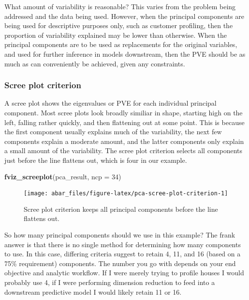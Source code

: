 \documentclass[]{book}
\newenvironment{Shaded}{\begin{snugshade}}{\end{snugshade}}
\newcommand{\DataTypeTok}[1]{\textcolor[rgb]{0.13,0.29,0.53}{#1}}
\newcommand{\DecValTok}[1]{\textcolor[rgb]{0.00,0.00,0.81}{#1}}
\newcommand{\KeywordTok}[1]{\textcolor[rgb]{0.13,0.29,0.53}{\textbf{#1}}}
\newcommand{\NormalTok}[1]{#1}
\theoremstyle{definition}
\theoremstyle{definition}
\theoremstyle{definition}
\theoremstyle{remark}
\begin{document}
What amount of variability is reasonable? This varies from the problem
being addressed and the data being used. However, when the principal
components are being used for descriptive purposes only, such as
customer profiling, then the proportion of variability explained may be
lower than otherwise. When the principal components are to be used as
replacements for the original variables, and used for further inference
in models downstream, then the PVE should be as much as can conveniently
be achieved, given any constraints.

\hypertarget{scree-plot-criterion}{%
\subsubsection{Scree plot criterion}\label{scree-plot-criterion}}

A scree plot shows the eigenvalues or PVE for each individual principal
component. Most scree plots look broadly similiar in shape, starting
high on the left, falling rather quickly, and then flattening out at
some point. This is because the first component usually explains much of
the variability, the next few components explain a moderate amount, and
the latter components only explain a small amount of the variability.
The scree plot criterion selects all components just before the line
flattens out, which is four in our example.

\begin{Shaded}
\begin{Highlighting}[]
\KeywordTok{fviz_screeplot}\NormalTok{(pca_result, }\DataTypeTok{ncp =} \DecValTok{34}\NormalTok{)}
\end{Highlighting}
\end{Shaded}

\begin{figure}

{\centering \texttt{[image: abar\_files/figure-latex/pca-scree-plot-criterion-1]} 

}

\caption{Scree plot criterion keeps all principal components before the line flattens out.}\label{fig:pca-scree-plot-criterion}
\end{figure}

So how many principal components should we use in this example? The
frank answer is that there is no single method for determining how many
components to use. In this case, differing criteria suggest to retain 4,
11, and 16 (based on a 75\% requirement) components. The number you go
with depends on your end objective and analytic workflow. If I were
merely trying to profile houses I would probably use 4, if I were
performing dimension reduction to feed into a downstream predictive
model I would likely retain 11 or 16.
\end{document}
